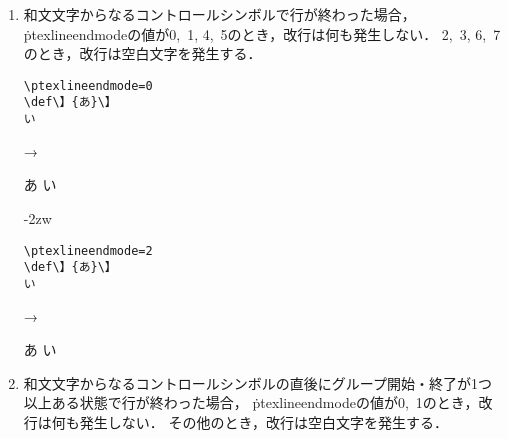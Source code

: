 \documentclass[a4paper,11pt,nomag,dvipdfmx]{jsarticle}
\begin{document}
\begin{dangerous}
\begin{enumerate}
    \medskip
    \begin{minipage}[t]{13zw}
\begin{verbatim}
\ptexlineendmode=0
\def\漢{あ}{\漢}
い
\end{verbatim}
    \end{minipage}\quad →\quad
    \begin{minipage}[t]{5zw}
\def\漢{あ}{\漢}
い
    \end{minipage}%
    \hfill\vrule\hfill\kern-2zw
    \begin{minipage}[t]{13zw}
\begin{verbatim}
\ptexlineendmode=1
\def\漢{あ}{\漢}
い
\end{verbatim}
    \end{minipage}\quad →\quad
    \begin{minipage}[t]{5zw}
\def\漢{あ}{\漢}
い
    \end{minipage}
    \item 和文文字からなるコントロールシンボルで行が終わった場合，
    \.{ptexlineendmode}の値が0,~1, 4,~5のとき，改行は何も発生しない．
    2,~3, 6,~7のとき，改行は空白文字を発生する．

    \medskip
    \begin{minipage}[t]{13zw}
\begin{verbatim}
\ptexlineendmode=0
\def\】{あ}\】
い
\end{verbatim}
    \end{minipage}\quad →\quad
    \begin{minipage}[t]{5zw}
\def\】{あ}\】
い
    \end{minipage}%
    \hfill\vrule\hfill\kern-2zw
    \begin{minipage}[t]{13zw}
\begin{verbatim}
\ptexlineendmode=2
\def\】{あ}\】
い
\end{verbatim}
    \end{minipage}\quad →\quad
    \begin{minipage}[t]{5zw}
\def\】{あ}\】
い
    \end{minipage}
    \item 和文文字からなるコントロールシンボルの直後にグループ開始・終了が1つ以上ある状態で行が終わった場合，
    \.{ptexlineendmode}の値が0,~1のとき，改行は何も発生しない．
    その他のとき，改行は空白文字を発生する．


\end{enumerate}
\end{dangerous}
\end{document}
